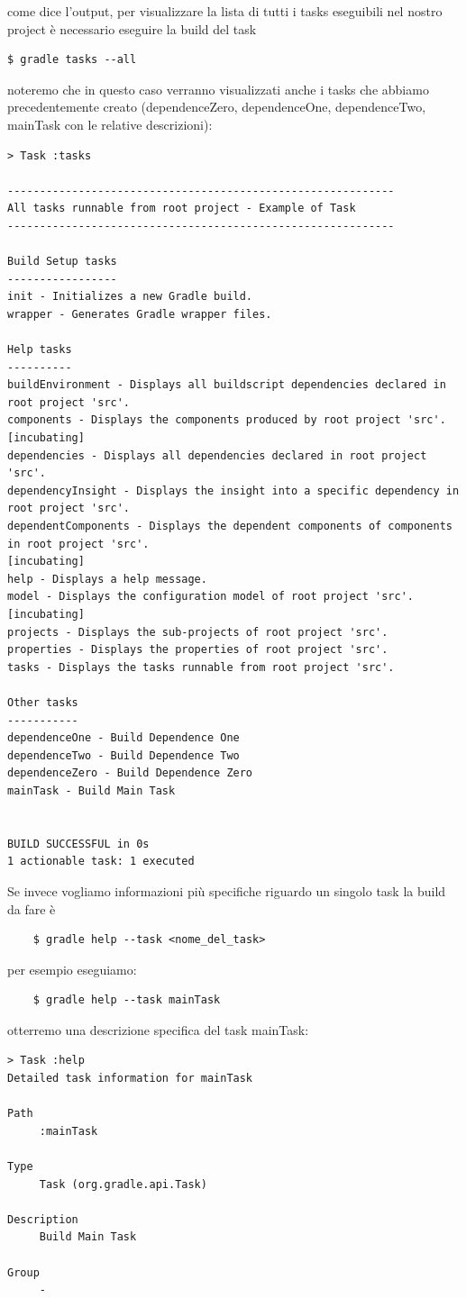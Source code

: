 come dice l'output, per visualizzare la lista di tutti i tasks eseguibili nel nostro project è necessario eseguire la build del task \begin{verbatim}$ gradle tasks --all \end{verbatim} noteremo che in questo caso verranno visualizzati anche i tasks che abbiamo precedentemente creato (dependenceZero, dependenceOne, dependenceTwo, mainTask con le relative descrizioni):
\begin{verbatim}
> Task :tasks 

------------------------------------------------------------
All tasks runnable from root project - Example of Task
------------------------------------------------------------

Build Setup tasks
-----------------
init - Initializes a new Gradle build.
wrapper - Generates Gradle wrapper files.

Help tasks
----------
buildEnvironment - Displays all buildscript dependencies declared in root project 'src'.
components - Displays the components produced by root project 'src'. [incubating]
dependencies - Displays all dependencies declared in root project 'src'.
dependencyInsight - Displays the insight into a specific dependency in root project 'src'.
dependentComponents - Displays the dependent components of components in root project 'src'. 
[incubating]
help - Displays a help message.
model - Displays the configuration model of root project 'src'. [incubating]
projects - Displays the sub-projects of root project 'src'.
properties - Displays the properties of root project 'src'.
tasks - Displays the tasks runnable from root project 'src'.

Other tasks
-----------
dependenceOne - Build Dependence One
dependenceTwo - Build Dependence Two
dependenceZero - Build Dependence Zero
mainTask - Build Main Task


BUILD SUCCESSFUL in 0s
1 actionable task: 1 executed
\end{verbatim}
Se invece vogliamo informazioni più specifiche riguardo un singolo task la build da fare è 
\begin{verbatim}
    $ gradle help --task <nome_del_task>\end{verbatim}
per esempio eseguiamo:
\begin{verbatim}
    $ gradle help --task mainTask\end{verbatim}
otterremo una descrizione specifica del task mainTask:
\begin{verbatim}
> Task :help 
Detailed task information for mainTask

Path
     :mainTask

Type
     Task (org.gradle.api.Task)

Description
     Build Main Task

Group
     -\end{verbatim}

